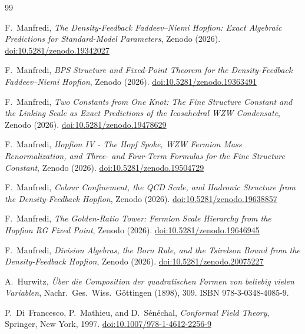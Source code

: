 \documentclass[11pt,a4paper]{article}
\theoremstyle{definition}
\theoremstyle{remark}
\begin{document}

\begin{thebibliography}{99}

F.~Manfredi,
\textit{The Density-Feedback Faddeev--Niemi Hopfion:
Exact Algebraic Predictions for Standard-Model Parameters},
Zenodo (2026).
\href{https://doi.org/10.5281/zenodo.19342027}{doi:10.5281/zenodo.19342027}

F.~Manfredi,
\textit{BPS Structure and Fixed-Point Theorem for the
Density-Feedback Faddeev--Niemi Hopfion},
Zenodo (2026).
\href{https://doi.org/10.5281/zenodo.19363491}{doi:10.5281/zenodo.19363491}

F.~Manfredi,
\textit{Two Constants from One Knot: The Fine Structure Constant and
the Linking Scale as Exact Predictions of the Icosahedral WZW Condensate},
Zenodo (2026).
\href{https://doi.org/10.5281/zenodo.19478629}{doi:10.5281/zenodo.19478629}

F.~Manfredi,
\textit{Hopfion IV - The Hopf Spoke, WZW Fermion Mass Renormalization, and Three- and Four-Term Formulas for the Fine Structure Constant},
Zenodo (2026).
\href{https://doi.org/10.5281/zenodo.19504729}{doi:10.5281/zenodo.19504729}

F.~Manfredi,
\textit{Colour Confinement, the QCD Scale, and Hadronic Structure
from the Density-Feedback Hopfion},
Zenodo (2026).
\href{https://doi.org/10.5281/zenodo.19638857}{doi:10.5281/zenodo.19638857}

F.~Manfredi,
\textit{The Golden-Ratio Tower: Fermion Scale Hierarchy from the Hopfion RG Fixed Point},
Zenodo (2026).
\href{https://doi.org/10.5281/zenodo.19646945}{doi:10.5281/zenodo.19646945}

F.~Manfredi,
\textit{Division Algebras, the Born Rule, and the Tsirelson Bound from the Density-Feedback Hopfion},
Zenodo (2026).
\href{https://doi.org/10.5281/zenodo.20075227}{doi:10.5281/zenodo.20075227}

A.~Hurwitz,
\textit{\"Uber die Composition der quadratischen Formen von beliebig vielen
Variablen},
Nachr.\ Ges.\ Wiss.\ G\"ottingen (1898), 309.
ISBN 978-3-0348-4085-9.

P.~Di~Francesco, P.~Mathieu, and D.~S\'en\'echal,
\textit{Conformal Field Theory},
Springer, New York, 1997.
\href{https://doi.org/10.1007/978-1-4612-2256-9}{doi:10.1007/978-1-4612-2256-9}


\end{thebibliography}
\end{document}

